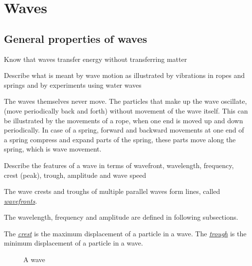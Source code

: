 \section{Waves}
\subsection{General properties of waves}

\begin{point}
Know that waves transfer energy without transferring matter
\end{point}

\begin{point}
Describe what is meant by wave motion as illustrated by vibrations in ropes and springs and by experiments 
using water waves
\end{point}

The waves themselves never move. The particles that make up the wave oscillate, (move periodically
back and forth) without movement of the wave itself. This can be illustrated by the movements
of a rope, when one end is moved up and down periodically. In case of a spring, forward and
backward movements at one end of a spring compress and expand parts of the spring, these parts
move along the spring, which is wave movement.

\begin{point}
Describe the features of a wave in terms of wavefront, wavelength, frequency, crest (peak), trough, 
amplitude and wave speed
\end{point}

The wave crests and troughs of multiple parallel waves form lines, called \ul{\emph{wavefronts}}. 

The wavelength, frequency and amplitude are defined in following subsections.

The \ul{\emph{crest}} is the maximum displacement of a particle in a wave.
The \ul{\emph{trough}} is the minimum displacement of a particle in a wave.

\begin{figure}
	\centering
	\caption{A wave}
\end{figure}

